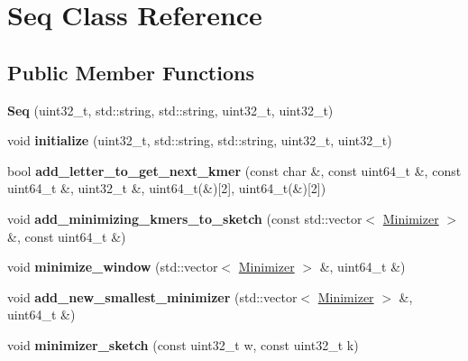 \hypertarget{classSeq}{}\section{Seq Class Reference}
\label{classSeq}
\subsection*{Public Member Functions}
\begin{DoxyCompactItemize}
\item 
\mbox{\label{classSeq_a3a0b4b1578f2dd9fd369bad28a2f81df}} 
{\bfseries Seq} (uint32\+\_\+t, std\+::string, std\+::string, uint32\+\_\+t, uint32\+\_\+t)
\item 
\mbox{\label{classSeq_a6cc4fcb51f6c8df1c01b577c7b4dab13}} 
void {\bfseries initialize} (uint32\+\_\+t, std\+::string, std\+::string, uint32\+\_\+t, uint32\+\_\+t)
\item 
\mbox{\label{classSeq_a63222414c30166df6a600d1026f7b9be}} 
bool {\bfseries add\+\_\+letter\+\_\+to\+\_\+get\+\_\+next\+\_\+kmer} (const char \&, const uint64\+\_\+t \&, const uint64\+\_\+t \&, uint32\+\_\+t \&, uint64\+\_\+t(\&)\mbox{[}2\mbox{]}, uint64\+\_\+t(\&)\mbox{[}2\mbox{]})
\item 
\mbox{\label{classSeq_abd7c9d3b5d760d8faabbb00fa52b2a56}} 
void {\bfseries add\+\_\+minimizing\+\_\+kmers\+\_\+to\+\_\+sketch} (const std\+::vector$<$ \hyperlink{structMinimizer}{Minimizer} $>$ \&, const uint64\+\_\+t \&)
\item 
\mbox{\label{classSeq_a35c3c8d99777c39df5343603b87a7e54}} 
void {\bfseries minimize\+\_\+window} (std\+::vector$<$ \hyperlink{structMinimizer}{Minimizer} $>$ \&, uint64\+\_\+t \&)
\item 
\mbox{\label{classSeq_a3c90f2abd6ab7bcd1dcb788a3423a388}} 
void {\bfseries add\+\_\+new\+\_\+smallest\+\_\+minimizer} (std\+::vector$<$ \hyperlink{structMinimizer}{Minimizer} $>$ \&, uint64\+\_\+t \&)
\item 
\mbox{\label{classSeq_a00227ec5e397a525f727be95aa4c6b3e}} 
void {\bfseries minimizer\+\_\+sketch} (const uint32\+\_\+t w, const uint32\+\_\+t k)
\end{DoxyCompactItemize}

